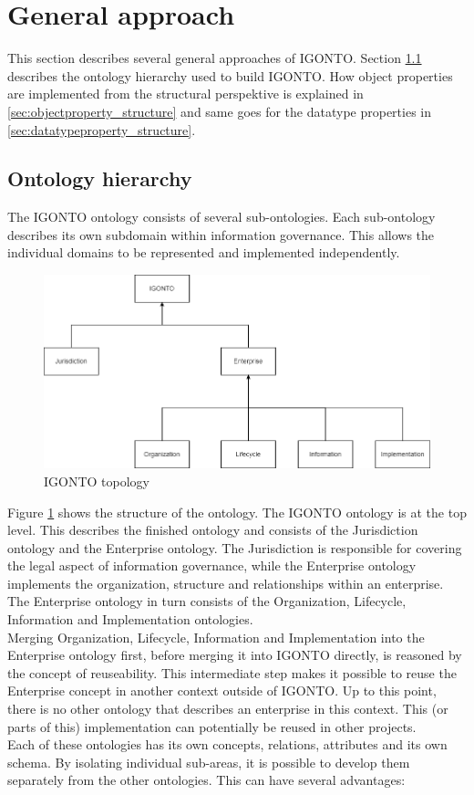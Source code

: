 \documentclass[
  a4paper,  %
  twoside,  %
  bibliography=totoc,
  headsepline,
  cleardoublepage=empty,
  parskip=half,
  draft=false
]{scrbook}
\begin{document}
\section{General approach}
This section describes several general approaches of IGONTO. Section \ref{sec:ontology_hierarchy} describes the ontology hierarchy used to build IGONTO. How object properties are implemented from the structural perspektive is explained in \ref{sec:objectproperty_structure} and same goes for the datatype properties in \ref{sec:datatypeproperty_structure}.    


\subsection{Ontology hierarchy}\label{sec:ontology_hierarchy}
The IGONTO ontology consists of several sub-ontologies. Each sub-ontology describes its own subdomain within information governance. This allows the individual domains to be represented and implemented independently. 
  
\begin{figure}
  \centering
  \includegraphics[width=\textwidth]{graphics/topology.PNG}
  \caption{IGONTO topology}
  \label{fig:topology}
\end{figure}

Figure \ref{fig:topology} shows the structure of the ontology. The IGONTO ontology is at the top level. This describes the finished ontology and consists of the Jurisdiction ontology and the Enterprise ontology. The Jurisdiction is responsible for covering the legal aspect of information governance, while the Enterprise ontology implements the organization, structure and relationships within an enterprise. The Enterprise ontology in turn consists of the Organization, Lifecycle, Information and Implementation ontologies. \\
Merging Organization, Lifecycle, Information and Implementation into the Enterprise ontology first, before merging it into IGONTO directly, is reasoned by the concept of reuseability. This intermediate step makes it possible to reuse the Enterprise concept in another context outside of IGONTO. Up to this point, there is no other ontology that describes an enterprise in this context. This (or parts of this) implementation can potentially be reused in other projects.\\
Each of these ontologies has its own concepts, relations, attributes and its own schema. By isolating individual sub-areas, it is possible to develop them separately from the other ontologies. This can have several advantages: 
\end{document}
